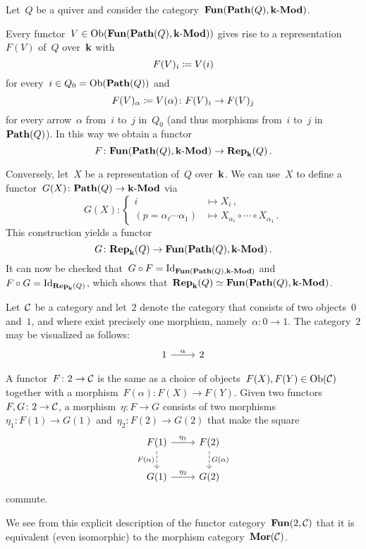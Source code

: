 \begin{example}
  Let~$Q$ be a quiver and consider the category~$\mathbf{Fun}(\mathbf{Path}(Q),\text{$\mathbf{k}$-$\mathbf{Mod}$})$.
  
  Every functor~$V \in \operatorname{Ob}(\mathbf{Fun}(\mathbf{Path}(Q),\text{$\mathbf{k}$-$\mathbf{Mod}$}))$ gives rise to a representation~$F(V)$ of~$Q$ over~$\mathbf{k}$ with
  \[
              F(V)_i
    \coloneqq  V(i)
  \]
  for every~$i \in Q_0 = \operatorname{Ob}(\mathbf{Path}(Q))$ and
  \[
              F(V)_\alpha
    \coloneqq  V(\alpha)
    \colon    F(V)_i
    \to       F(V)_j
  \]
  for every arrow~$\alpha$ from~$i$ to~$j$ in~$Q_0$ (and thus morphisms from~$i$ to~$j$ in~$\mathbf{Path}(Q)$).
  In this way we obtain a functor
  \[
            F
    \colon  \mathbf{Fun}(\mathbf{Path}(Q), \text{$\mathbf{k}$-$\mathbf{Mod}$})
    \to     \mathbf{Rep}_{\mathbf{k}}(Q)  \,.
  \]
  
  Conversely, let~$X$ be a representation of~$Q$ over~$\mathbf{k}$.
  We can use~$X$ to define a functor~$G(X) \colon \mathbf{Path}(Q) \to \text{$\mathbf{k}$-$\mathbf{Mod}$}$ via
  \[
            G(X)
    \colon  \left\{
              \begin{aligned}
                          i
                &\mapsto  X_i \,, \\
                          (p = \alpha_\ell \dotsm \alpha_1)
                &\mapsto  X_{\alpha_\ell} \circ \dotsb \circ X_{\alpha_1} \,.
              \end{aligned}
            \right.
  \]
  This construction yields a functor
  \[
            G
    \colon  \mathbf{Rep}_{\mathbf{k}}(Q)
    \to     \mathbf{Fun}(\mathbf{Path}(Q), \text{$\mathbf{k}$-$\mathbf{Mod}$}) \,.
  \]
  It can now be checked that~$G \circ F = \mathrm{Id}_{\mathbf{Fun}(\mathbf{Path}(Q), \text{$\mathbf{k}$-$\mathbf{Mod}$})}$ and~$F \circ G = \mathrm{Id}_{\mathbf{Rep}_{\mathbf{k}}(Q)}$, which shows that~$\mathbf{Rep}_{\mathbf{k}}(Q) \simeq \mathbf{Fun}(\mathbf{Path}(Q), \text{$\mathbf{k}$-$\mathbf{Mod}$})$.
\end{example}


\begin{example*}
  \label{morphism category is a functor category}
  Let~$\mathcal{C}$ be a category and let~$2$ denote the category that consists of two objects~$0$ and~$1$, and where exist precisely one  morphism, namely~$\alpha \colon 0 \to 1$.
  The category~$2$ may be visualized as follows:
  \[
    \begin{tikzcd}
        1
        \arrow{r}[above]{\alpha}
      & 2
    \end{tikzcd}
  \]
  
  A functor~$F \colon 2 \to \mathcal{C}$ is the same as a choice of objects~$F(X), F(Y) \in \operatorname{Ob}(\mathcal{C})$ together with a morphism~$F(\alpha) \colon F(X) \to F(Y)$.
  Given two functors~$F, G \colon 2 \to \mathcal{C}$, a morphism~$\eta \colon F \to G$ consists of two morphisms~$\eta_1 \colon F(1) \to G(1)$ and~$\eta_2 \colon F(2) \to G(2)$ that make the square
  \[
    \begin{tikzcd}
        F(1)
        \arrow{r}[above]{\eta_1}
        \arrow[dashed]{d}[left]{F(\alpha)}
      & F(2)
        \arrow[dashed]{d}[right]{G(\alpha)}
      \\
        G(1)
        \arrow{r}[above]{\eta_2}
      & G(2)
    \end{tikzcd}
  \]
  commute.
  
  We see from this explicit description of the functor category~$\mathbf{Fun}(2, \mathcal{C})$ that it is equivalent (even isomorphic) to the morphism category~$\mathbf{Mor}(\mathcal{C})$.
\end{example*}


